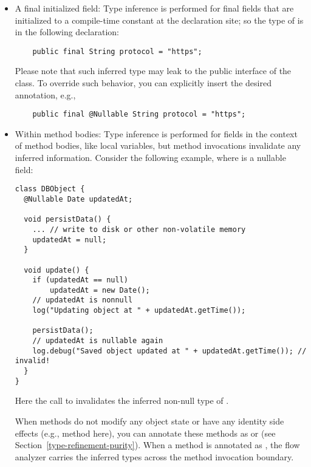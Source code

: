 \begin{itemize}

\item
A final initialized field:
Type inference is performed for final fields that are initialized to a
compile-time constant at the declaration site; so the type of 
is  in the following declaration:

\begin{Verbatim}
    public final String protocol = "https";
\end{Verbatim}

Please note that such inferred type may leak to the public interface of the
class.  To override such behavior, you can explicitly insert the desired
annotation, e.g.,

\begin{Verbatim}
    public final @Nullable String protocol = "https";
\end{Verbatim}

\item
Within method bodies:
Type inference is performed for fields in the context of method bodies,
like local variables, but method invocations invalidate any inferred
information.  Consider the following example, where  is a nullable
field:

\begin{Verbatim}
class DBObject {
  @Nullable Date updatedAt;

  void persistData() {
    ... // write to disk or other non-volatile memory
    updatedAt = null;
  }

  void update() {
    if (updatedAt == null)
        updatedAt = new Date();
    // updatedAt is nonnull
    log("Updating object at " + updatedAt.getTime());

    persistData();
    // updatedAt is nullable again
    log.debug("Saved object updated at " + updatedAt.getTime()); // invalid!
  }
}
\end{Verbatim}

Here the call to  invalidates the inferred non-null type
of .

When methods do not modify any object state or have any identity side
effects (e.g.,  method here), you can annotate these methods as
 or  (see
Section~\ref{type-refinement-purity}).  When a method is annotated as
, the flow analyzer carries the inferred types across
the method invocation boundary.

\end{itemize}



